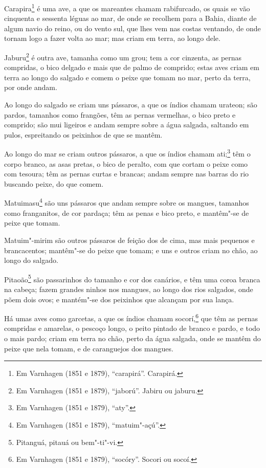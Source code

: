 Carapira\footnote{ Em Varnhagen (1851 e 1879), ``carapirá''. Carapirá.} é uma ave, a que
os mareantes chamam rabifurcado, os quais se vão cinquenta e sessenta léguas ao mar, de
onde se recolhem para a Bahia, diante de algum navio do reino, ou do vento sul, que lhes
vem nas costas ventando, de onde tornam logo a fazer volta ao mar; mas criam em terra, ao
longo dele.

Jaburu\footnote{ Em Varnhagen (1851 e 1879), ``jaború''. Jabiru ou jaburu.} é outra ave,
tamanha como um grou; tem a cor cinzenta, as pernas compridas, o bico delgado e mais que
de palmo de comprido; estas aves criam em terra ao longo do salgado e comem o peixe que
tomam no mar, perto da terra, por onde andam.

Ao longo do salgado se criam uns pássaros, a que os índios chamam urateon; são pardos,
tamanhos como frangões, têm as pernas vermelhas, o bico preto e comprido; são mui ligeiros
e andam sempre sobre a água salgada, saltando em pulos, espreitando os peixinhos de que se
mantêm.

Ao longo do mar se criam outros pássaros, a que os índios chamam ati;\footnote{ Em
Varnhagen (1851 e 1879), ``aty''.} têm o corpo branco, as asas pretas, o bico de
peralto, com que cortam o peixe como com tesoura; têm as pernas curtas e brancas; andam
sempre nas barras do rio buscando peixe, do que comem.

Matuimasu\footnote{ Em Varnhagen (1851 e 1879), ``matuim"-açú''.} são uns pássaros que
andam sempre sobre os mangues, tamanhos como franganitos, de cor pardaça; têm as penas e
bico preto, e mantêm"-se de peixe que tomam.

Matuim"-mirim são outros pássaros de feição dos de cima, mas mais pequenos e brancacentos;
mantêm"-se do peixe que tomam; e uns e outros criam no chão, ao longo do salgado.

Pitaoão\footnote{ Pitanguá, pitauá ou bem"-ti"-vi.} são passarinhos do tamanho e cor dos
canários, e têm uma coroa branca na cabeça; fazem grandes ninhos nos mangues, ao longo dos
rios salgados, onde põem dois ovos; e mantém"-se dos peixinhos que alcançam por sua lança.

Há umas aves como garcetas, a que os índios chamam socorí,\footnote{ Em Varnhagen (1851 e
1879), ``socóry''. Socori ou socoí.} que têm as pernas compridas e amarelas, o pescoço
longo, o peito pintado de branco e pardo, e todo o mais pardo; criam em terra no chão,
perto da água salgada, onde se mantêm do peixe que nela tomam, e de caranguejos dos
mangues.

